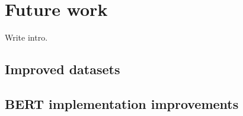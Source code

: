 \chapter{Future work}
\label{ch:future_work}

Write intro.

\section{Improved datasets}
\label{sec:improved_datasets} %


\section{BERT implementation improvements}
\label{sec:bert_implementation_improvements}
